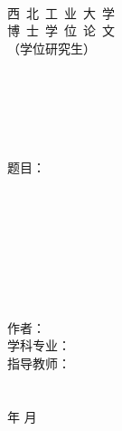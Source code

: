 \begin{titlepage}
	\sSanhao ~
	\begin{spacing}{1.5}
		\begin{center}
			\begin{center}
				\sSanhao 西~北~工~业~大~学 \\
				\sYihao 博~士~学~位~论~文 \\ %
				\sSihao （学位研究生）\\
			\end{center}
			\fSong \sSihao ~ \\
			\fSong \sSihao ~ \\
			\fSong \sSihao ~ \\
			\fSong \sSihao ~ \\
			\fSong \sSihao ~ \\
			\fSong \sErhao \hspace{1em} 题目：\hspace{0.2cm} \\
			\hspace{1em} \phantom{大空格}\hspace{0.2cm} \\
			\fSong \sWuhao ~ \\
			\fSong \sWuhao ~ \\
			\fSong \sWuhao ~ \\
			\fSong \sWuhao ~ \\
			\fSong \sWuhao ~ \\
			\fSong \sWuhao ~ \\
			\fSong \sWuhao ~ \\
			\sSanhao 作\phantom{空格}者：\coverunderline[5.5cm]{\authorname} \\
			\sSanhao 学科专业： \\
			\sSanhao 指导教师： \\
			\fSong \sWuhao ~ \\
			\fSong \sWuhao ~ \\
			\fSong \sSanhao {}\fSong 年 \fSong 月
		\end{center}
	\end{spacing}
\end{titlepage}

\fSong \normalsize

\endinput
